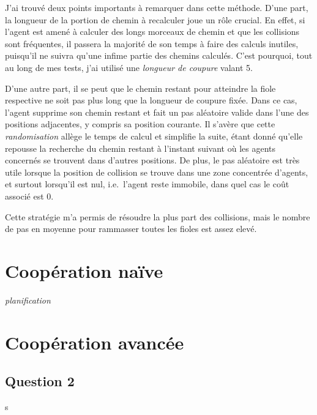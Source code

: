 \documentclass[12pt,a4paper]{article}
\begin{document}
J'ai trouv\'e deux points importants \`a remarquer dans cette m\'ethode. D'une part, la longueur de la portion de chemin \`a recalculer joue un r\^ole crucial. En effet, si l'agent est amen\'e \`a calculer des longs morceaux de chemin et que les collisions sont fr\'equentes, il passera la majorit\'e de son temps \`a faire des calculs inutiles, puisqu'il ne suivra qu'une infime partie des chemins calcul\'es. C'est pourquoi, tout au long de mes tests, j'ai utilis\'e une \textit{longueur de coupure} valant 5.

D'une autre part, il se peut que le chemin restant pour atteindre la fiole respective ne soit pas plus long que la longueur de coupure fix\'ee. Dans ce cas, l'agent supprime son chemin restant et fait un pas al\'eatoire valide dans l'une des positions adjacentes, y compris sa position courante. Il s'av\`ere que cette \textit{randomisation} all\`ege le temps de calcul et simplifie la suite, \'etant donn\'e qu'elle repousse la recherche du chemin restant \`a l'instant suivant o\`u les agents concern\'es se trouvent dans d'autres positions. De plus, le pas al\'eatoire est tr\`es utile lorsque la position de collision se trouve dans une zone concentr\'ee d'agents, et surtout lorsqu'il est nul, i.e.\ l'agent reste immobile, dans quel cas le co\^ut associ\'e est 0.

Cette strat\'egie m'a permis de r\'esoudre la plus part des collisions, mais le nombre de pas en moyenne pour rammasser toutes les fioles est assez elev\'e.

\section{Coop\'eration na\"ive}
\textit{planification}

\section{Coop\'eration avanc\'ee}


\subsection*{Question 2}
s

	
\printindex
\end{document}
